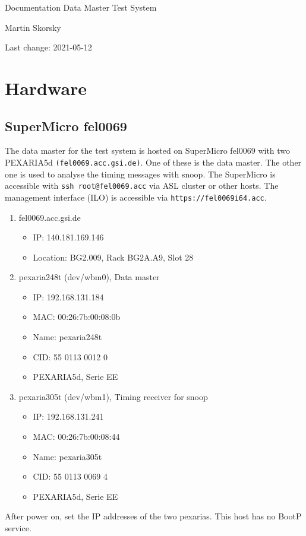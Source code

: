 \documentclass[12pt,a4paper]{report}
\begin{document}
\begin{titlepage}
\vspace{2cm}
\begin{center}
\Huge{Documentation Data Master Test System}

\Large{Martin Skorsky}

\Large{Last change: 2021-05-12}
\end{center}
\vfill
\end{titlepage}

\tableofcontents

\chapter{Hardware}
\section{SuperMicro fel0069}
The data master for the test system is hosted on SuperMicro fel0069 with two PEXARIA5d \texttt{(fel0069.acc.gsi.de)}.
One of these is the data master. The other one is used to analyse the timing messages with snoop.
The SuperMicro is accessible with \texttt{ssh root@fel0069.acc} via ASL cluster or other hosts.
The management interface (ILO) is accessible via \texttt{https://fel0069i64.acc}.
\begin{enumerate}
\item fel0069.acc.gsi.de
\begin{itemize}
\item IP: 140.181.169.146
\item Location: BG2.009, Rack BG2A.A9, Slot 28
\end{itemize}
\item pexaria248t (dev/wbm0), Data master
\begin{itemize}
\item IP: 192.168.131.184
\item MAC: 00:26:7b:00:08:0b
\item Name: pexaria248t
\item CID: 55 0113 0012 0
\item PEXARIA5d, Serie EE
\end{itemize}
\item pexaria305t (dev/wbm1), Timing receiver for snoop
\begin{itemize}
\item IP: 192.168.131.241
\item MAC: 00:26:7b:00:08:44
\item Name: pexaria305t
\item CID: 55 0113 0069 4
\item PEXARIA5d, Serie EE
\end{itemize}
\end{enumerate}
After power on, set the IP addresses of the two pexarias. This host has no BootP service.
\end{document}
